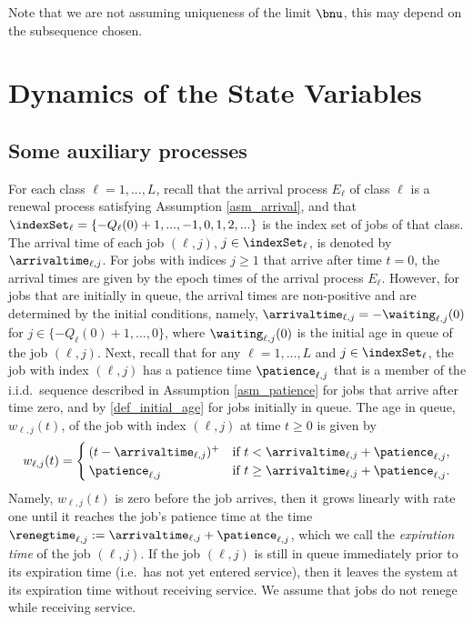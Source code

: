 \documentclass{article}
\begin{document}
\begin{remark}
Note that we are not assuming uniqueness of the limit $\bnu$, this may depend on the  subsequence chosen.
\end{remark}




\section{Dynamics of the State Variables}



\subsection{Some auxiliary processes}
For each class $\ell=1,...,L$, recall that the arrival process $E_\ell$ of class $\ell$ is a renewal process satisfying Assumption \ref{asm_arrival}, and that $\indexSet_\ell=\{-Q_\ell(0)+1,...,-1,0,1,2,...\}$ is the index set of jobs of that class. The arrival time of each job $(\ell,j)$, $j\in \indexSet_\ell$, is denoted by $\arrivaltime_{\ell,j}$. For jobs with indices $j\geq1$ that arrive after time $t=0$, the arrival times are given by the epoch times of the arrival process $E_\ell$. However, for jobs  that are initially in queue, the arrival times are non-positive and are determined by the initial conditions, namely,  $\arrivaltime_{\ell,j}=-\waiting_{\ell,j}(0)$ for $j\in\{-Q_\ell(0)+1,...,0\}$, where $\waiting_{\ell,j}(0)$ is the initial age in queue of the job $(\ell,j)$. Next, recall that for any $\ell=1,...,L$ and $j\in\indexSet_\ell$, the job with index $(\ell,j)$ has a patience time $\patience_{\ell,j}$ that is a member of the i.i.d.\ sequence described in Assumption \ref{asm_patience} for jobs that arrive after time zero, and by \eqref{def_initial_age} for jobs initially in queue. The age in queue, $w_{\ell,j}(t)$, of the job with index $(\ell,j)$ at time $t\geq0$ is given by
\begin{equation}\label{def_w}
w_{\ell,j}(t)=
  \begin{cases} (t-\arrivaltime_{\ell,j})^+ & \text{if }  t<\arrivaltime_{\ell,j}+\patience_{\ell,j},\\
  \patience_{\ell,j}& \text{if }t\geq \arrivaltime_{\ell,j}+\patience_{\ell,j}.
  \end{cases}
\end{equation}
Namely, $w_{\ell,j}(t)$ is zero before the job arrives, then it grows linearly with rate one until it reaches the job's patience time at the time $\renegtime_{\ell,j}:=\arrivaltime_{\ell,j}+\patience_{\ell,j}$, which we call the \textit{expiration time} of the job $(\ell,j)$. If the job $(\ell,j)$ is still in queue immediately prior to its expiration time (i.e.\ has not yet entered service), then it leaves the system at its expiration time without receiving service. We assume that jobs do not renege while receiving service. 
\end{document}
